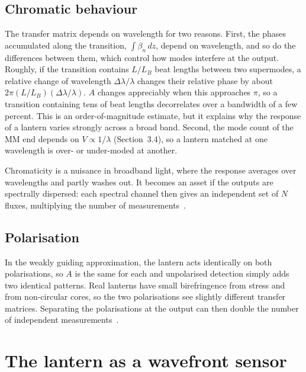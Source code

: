 \documentclass[11pt,a4paper]{article}
\begin{document}
\subsection{Chromatic behaviour}
The transfer matrix depends on wavelength for two reasons. First, the phases accumulated along the transition, $\int \beta_n\,dz$, depend on wavelength, and so do the differences between them, which control how modes interfere at the output. Roughly, if the transition contains $L/L_B$ beat lengths between two supermodes, a relative change of wavelength $\Delta\lambda/\lambda$ changes their relative phase by about $2\pi (L/L_B)(\Delta\lambda/\lambda)$. $A$ changes appreciably when this approaches $\pi$, so a transition containing tens of beat lengths decorrelates over a bandwidth of a few percent. This is an order-of-magnitude estimate, but it explains why the response of a lantern varies strongly across a broad band. Second, the mode count of the MM end depends on $V \propto 1/\lambda$ (Section~3.4), so a lantern matched at one wavelength is over- or under-moded at another.

Chromaticity is a nuisance in broadband light, where the response averages over wavelengths and partly washes out. It becomes an asset if the outputs are spectrally dispersed: each spectral channel then gives an independent set of $N$ fluxes, multiplying the number of measurements~\cite{Lin2025}.

\subsection{Polarisation}
In the weakly guiding approximation, the lantern acts identically on both polarisations, so $A$ is the same for each and unpolarised detection simply adds two identical patterns. Real lanterns have small birefringence from stress and from non-circular cores, so the two polarisations see slightly different transfer matrices. Separating the polarisations at the output can then double the number of independent measurements~\cite{Lin2023PRL}.

\section{The lantern as a wavefront sensor}
\label{sec:sensor}
\end{document}
